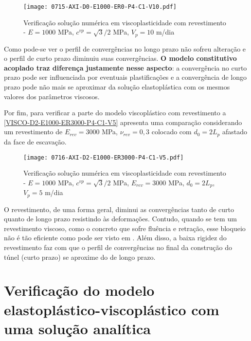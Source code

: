\begin{figure}[H]
	\begin{center}
		\texttt{[image: 0715-AXI-D0-E1000-ER0-P4-C1-V10.pdf]}
	\end{center}
	\caption{\label{VISCO-D0-E1000-ER0-P4-C1-V10}Verificação solução numérica em viscoplasticidade com revestimento - $E = 1000$ MPa, $c^{vp}=\sqrt{3}/2$ MPa, $V_p=10$ m/dia}
\end{figure}
Como pode-se ver o perfil de convergências no longo prazo não sofreu alteração e o perfil de curto prazo diminuiu suas convergências. \textbf{O modelo constitutivo acoplado traz diferença justamente nesse aspecto}: a convergência no curto prazo pode ser influenciada por eventuais plastificações e a convergência de longo prazo pode não mais se aproximar da solução elastoplástica com os mesmos valores dos parâmetros viscosos.

Por fim, para verificar a parte do modelo viscoplástico com revestimento a \autoref{VISCO-D2-E1000-ER3000-P4-C1-V5} apresenta uma comparação considerando um revestimento de $E_{rev}=3000$ MPa, $\nu_{rev}=0,3$ colocado com $d_0=2L_p$ afastado da face de escavação.

\begin{figure}[H]
	\begin{center}
		\texttt{[image: 0716-AXI-D2-E1000-ER3000-P4-C1-V5.pdf]}
	\end{center}
	\caption{\label{VISCO-D2-E1000-ER3000-P4-C1-V5}Verificação solução numérica em viscoplasticidade com revestimento - $E = 1000$ MPa, $c^{vp}=\sqrt{3}/2$ MPa, $E_{rev} = 3000$ MPa, $d_0=2L_p$, $V_p=5$ m/dia}
\end{figure}
O revestimento, de uma forma geral, diminui as convergências tanto de curto quanto de longo prazo resistindo às deformações. Contudo, quando se tem um revestimento viscoso, como o concreto que sofre fluência e retração, esse bloqueio não é tão eficiente como pode ser visto em . Além disso, a baixa rigidez do revestimento faz com que o perfil de convergências no final da construção do túnel (curto prazo) se aproxime do de longo prazo.

\section{Verificação do modelo elastoplástico-viscoplástico com uma solução analítica}

